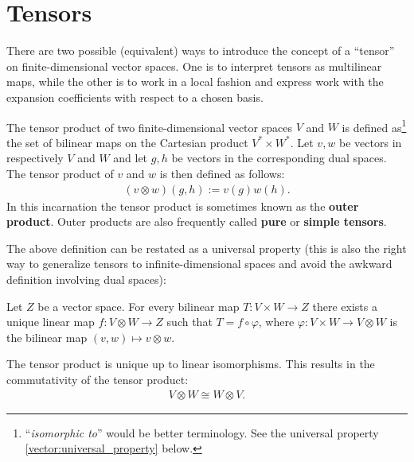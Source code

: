 \section{Tensors}\label{section:tensors}

    There are two possible (equivalent) ways to introduce the concept of a ``tensor'' on finite-dimensional vector spaces. One is to interpret tensors as multilinear maps, while the other is to work in a local fashion and express work with the expansion coefficients with respect to a chosen basis.

    \begin{definition}\label{vector:tensor_product}
        The tensor product of two finite-dimensional vector spaces $V$ and $W$ is defined as\footnote{``\textit{isomorphic to}'' would be better terminology. See the universal property \ref{vector:universal_property} below.} the set of bilinear maps on the Cartesian product $V^*\times W^*$. Let $v,w$ be vectors in respectively $V$ and $W$ and let $g,h$ be vectors in the corresponding dual spaces. The tensor product of $v$ and $w$ is then defined as follows:
        \begin{gather}
            (v\otimes w)(g,h) := v(g)w(h).
        \end{gather}
        In this incarnation the tensor product is sometimes known as the \textbf{outer product}. Outer products are also frequently called \textbf{pure} or \textbf{simple tensors}.
    \end{definition}

    The above definition can be restated as a universal property (this is also the right way to generalize tensors to infinite-dimensional spaces and avoid the awkward definition involving dual spaces):
    \begin{uproperty}\label{vector:universal_property}
        Let $Z$ be a vector space. For every bilinear map $T:V\times W\rightarrow Z$ there exists a unique linear map $f:V\otimes W\rightarrow Z$ such that $T = f\circ\varphi$, where $\varphi:V\times W\rightarrow V\otimes W$ is the bilinear map $(v,w)\mapsto v\otimes w$.
    \end{uproperty}
    \begin{result}
        The tensor product is unique up to linear isomorphisms. This results in the commutativity of the tensor product:
        \begin{gather}
           \label{vector:commutativity}
            V\otimes W \cong W\otimes V.
        \end{gather}
    \end{result}

